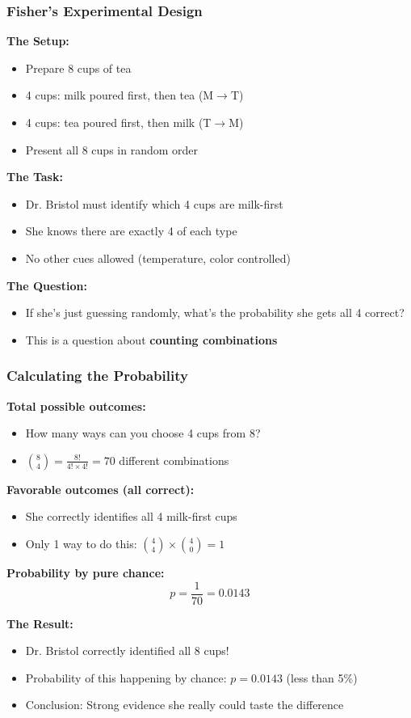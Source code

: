 \documentclass{beamer}
\begin{document}
\begin{frame}
\frametitle{Fisher's Experimental Design}
\textbf{The Setup:}
\begin{itemize}
\item Prepare 8 cups of tea
\item 4 cups: milk poured first, then tea (M$\rightarrow$T)
\item 4 cups: tea poured first, then milk (T$\rightarrow$M)
\item Present all 8 cups in random order
\end{itemize}

\vspace{0.5cm}
\textbf{The Task:}
\begin{itemize}
\item Dr. Bristol must identify which 4 cups are milk-first
\item She knows there are exactly 4 of each type
\item No other cues allowed (temperature, color controlled)
\end{itemize}

\vspace{0.5cm}
\textbf{The Question:}
\begin{itemize}
\item If she's just guessing randomly, what's the probability she gets all 4 correct?
\item This is a question about \textbf{counting combinations}
\end{itemize}
\end{frame}

\begin{frame}
\frametitle{Calculating the Probability}
\textbf{Total possible outcomes:}
\begin{itemize}
\item How many ways can you choose 4 cups from 8?
\item $\binom{8}{4} = \frac{8!}{4! \times 4!} = 70$ different combinations
\end{itemize}

\vspace{0.5cm}
\textbf{Favorable outcomes (all correct):}
\begin{itemize}
\item She correctly identifies all 4 milk-first cups
\item Only 1 way to do this: $\binom{4}{4} \times \binom{4}{0} = 1$
\end{itemize}

\vspace{0.5cm}
\textbf{Probability by pure chance:}
$$p = \frac{1}{70} = 0.0143$$

\vspace{0.3cm}
\textbf{The Result:}
\begin{itemize}
\item Dr. Bristol correctly identified all 8 cups!
\item Probability of this happening by chance: $p = 0.0143$ (less than 5\%)
\item Conclusion: Strong evidence she really could taste the difference
\end{itemize}
\end{frame}
\end{document}
